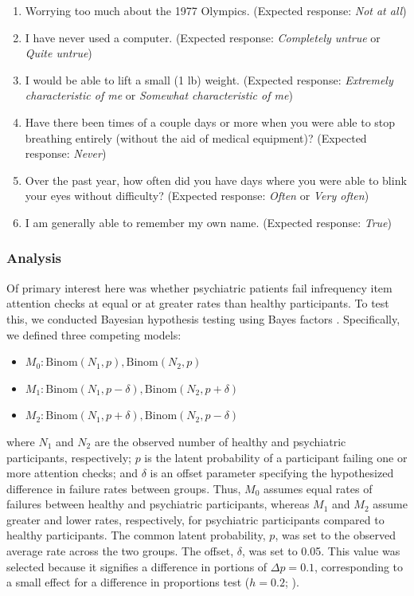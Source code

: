 \documentclass[a4paper,notitlepage,12pt]{article}
\begin{document}
\begin{refsection}[supp]
\begin{enumerate}
    \item Worrying too much about the 1977 Olympics. (Expected response: \textit{Not at all})
    \item I have never used a computer. (Expected response: \textit{Completely untrue} or \textit{Quite untrue})
    \item I would be able to lift a small (1 lb) weight. (Expected response: \textit{Extremely characteristic of me} or \textit{Somewhat characteristic of me})
    \item Have there been times of a couple days or more when you were able to stop breathing entirely (without the aid of medical equipment)? (Expected response: \textit{Never})
    \item Over the past year, how often did you have days where you were able to blink your eyes without difficulty? (Expected response: \textit{Often} or \textit{Very often})
    \item I am generally able to remember my own name. (Expected response: \textit{True})
\end{enumerate}

\subsubsection*{Analysis}

Of primary interest here was whether psychiatric patients fail infrequency item attention checks at equal or at greater rates than healthy participants. To test this, we conducted Bayesian hypothesis testing using Bayes factors \cite{harms2018making}. Specifically, we defined three competing models:

\begin{itemize}
    \item $M_0: \text{Binom}(N_1, p), \text{Binom}(N_2, p)$  
    \item $M_1: \text{Binom}(N_1, p - \delta), \text{Binom}(N_2, p + \delta)$  
    \item $M_2: \text{Binom}(N_1, p + \delta), \text{Binom}(N_2, p - \delta)$  
\end{itemize}

where $N_1$ and $N_2$ are the observed number of healthy and psychiatric participants, respectively; $p$ is the latent probability of a participant failing one or more attention checks; and $\delta$ is an offset parameter specifying the hypothesized difference in failure rates between groups. Thus, $M_0$ assumes equal rates of failures between healthy and psychiatric participants, whereas $M_1$ and $M_2$  assume greater and lower rates, respectively, for psychiatric participants compared to healthy participants. The common latent probability, $p$, was set to the observed average rate across the two groups. The offset, $\delta$, was set to 0.05. This value was selected because it signifies a difference in portions of $\Delta p = 0.1$, corresponding to a small effect for a difference in proportions test ($h = 0.2$; \cite{cohen2013statistical}). 


\end{refsection}
\end{document}
